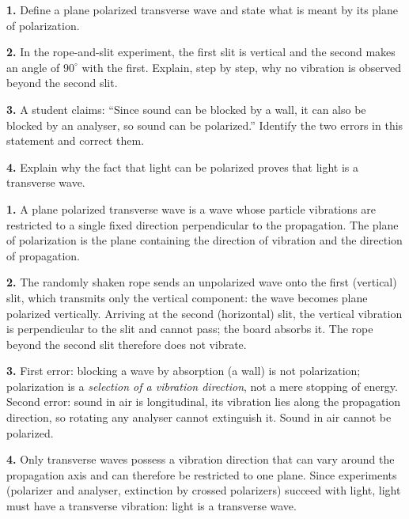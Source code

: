 \documentclass[11pt]{article}
\begin{document}
\begin{exercice}
\textbf{1.} Define a plane polarized transverse wave and state what is meant by its plane of polarization.

\textbf{2.} In the rope-and-slit experiment, the first slit is vertical and the second makes an angle of $90^\circ$ with the first. Explain, step by step, why no vibration is observed beyond the second slit.

\textbf{3.} A student claims: ``Since sound can be blocked by a wall, it can also be blocked by an analyser, so sound can be polarized.'' Identify the two errors in this statement and correct them.

\textbf{4.} Explain why the fact that light can be polarized proves that light is a transverse wave.
\end{exercice}

\begin{corrige}[Exercise 1]
\textbf{1.} A plane polarized transverse wave is a wave whose particle vibrations are restricted to a single fixed direction perpendicular to the propagation. The plane of polarization is the plane containing the direction of vibration and the direction of propagation.

\textbf{2.} The randomly shaken rope sends an unpolarized wave onto the first (vertical) slit, which transmits only the vertical component: the wave becomes plane polarized vertically. Arriving at the second (horizontal) slit, the vertical vibration is perpendicular to the slit and cannot pass; the board absorbs it. The rope beyond the second slit therefore does not vibrate.

\textbf{3.} First error: blocking a wave by absorption (a wall) is not polarization; polarization is a \emph{selection of a vibration direction}, not a mere stopping of energy. Second error: sound in air is longitudinal, its vibration lies along the propagation direction, so rotating any analyser cannot extinguish it. Sound in air cannot be polarized.

\textbf{4.} Only transverse waves possess a vibration direction that can vary around the propagation axis and can therefore be restricted to one plane. Since experiments (polarizer and analyser, extinction by crossed polarizers) succeed with light, light must have a transverse vibration: light is a transverse wave.
\end{corrige}
\end{document}
